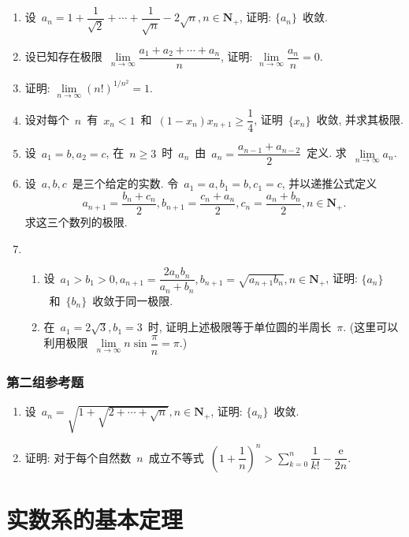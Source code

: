 \documentclass[UTF8,a4paper,10pt,twoside]{book}
\newcommand{\e}{\mathrm e}
\begin{document}
\begin{enumerate}
	\item 设~$a_n=1+\dfrac{1}{\sqrt{2}}+\cdots+\dfrac{1}{\sqrt{n}}-2\sqrt{n}, n\in\mathbf{N}_{+}$, 证明: $\{a_n\}$~收敛.

	\item 设已知存在极限~$\lim\limits_{n\to\infty} \dfrac{a_1+a_2+\cdots+a_n}{n}$, 证明: $\lim\limits_{n\to\infty} \dfrac{a_n}{n}=0$.

	\item 证明: $\lim\limits_{n\to\infty} (n!)^{1/n^2}=1$.

	\item 设对每个~$n$~有~$x_n<1$~和~$(1-x_n)x_{n+1}\geqslant \dfrac{1}{4}$, 证明~$\{x_n\}$~收敛, 并求其极限.

	\item 设~$a_1=b, a_2=c$, 在~$n\geqslant 3$~时~$a_n$~由~$a_n=\dfrac{a_{n-1}+a_{n-2}}{2}$~定义. 求~$\lim\limits_{n\to\infty} a_n$.

	\item 设~$a,b,c$~是三个给定的实数. 令~$a_1=a, b_1=b, c_1=c$, 并以递推公式定义
	      \[
		      a_{n+1}=\dfrac{b_n+c_n}{2}, b_{n+1}=\dfrac{c_n+a_n}{2}, c_n=\dfrac{a_n+b_n}{2}, n\in\mathbf{N}_{+}.
	      \]
	      求这三个数列的极限.

	\item
	      \begin{enumerate}[(1)]
		      \item 设~$a_1>b_1>0, a_{n+1}=\dfrac{2a_nb_n}{a_n+b_n}, b_{n+1}=\sqrt{a_{n+1}b_n}, n\in\mathbf{N}_{+}$, 证明: $\{a_n\}$~和~$\{b_n\}$~收敛于同一极限.
		      \item 在~$a_1=2\sqrt{3}, b_1=3$~时, 证明上述极限等于单位圆的半周长~$\pi$. (这里可以利用极限~$\lim\limits_{n\to\infty} n\sin{\dfrac{\pi}{n}}=\pi$.)
	      \end{enumerate}
\end{enumerate}
\subsection{第二组参考题}
\begin{enumerate}
	\item 设~$a_n=\sqrt{1+\sqrt{2+\cdots+\sqrt{n}}}, n\in\mathbf{N}_{+}$, 证明: $\{a_n\}$~收敛.

	\item 证明: 对于每个自然数~$n$~成立不等式~$\left(1+\dfrac{1}{n}\right)^n>\sum\limits_{k=0}^n\dfrac{1}{k!}-\dfrac{\e}{2n}$.
\end{enumerate}

\chapter{实数系的基本定理}
\end{document}
